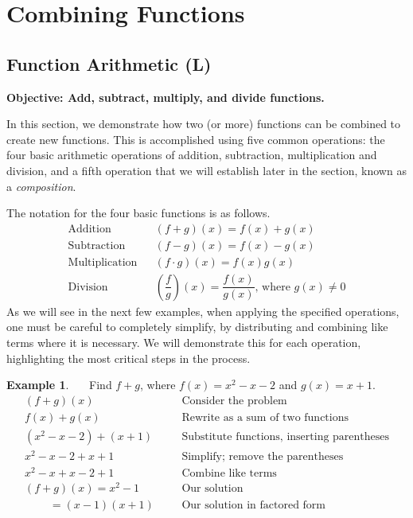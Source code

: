\documentclass[12pt]{book}
\theoremstyle{definition}
\newtheorem{example}{Example}
\newcommand{\tmop}[1]{\ensuremath{\operatorname{#1}}}
\begin{document}
\section{Combining Functions}
\subsection{Function Arithmetic (L)}
{\bf Objective: Add, subtract, multiply, and divide functions.}\par
In this section, we demonstrate how two (or more) functions can be combined to create new functions. This is accomplished using five common
operations:  the four basic arithmetic operations of addition, subtraction, multiplication and division, and a fifth operation that we will establish later in the section, known as a {\it composition}.\par
The notation for the four basic functions is as follows. 
\begin{eqnarray*}
  \tmop{Addition} &  & (f + g) (x) = f (x) + g (x)\\   %
  \tmop{Subtraction} &  & (f - g) (x) = f (x) - g (x)\\  %
  \tmop{Multiplication} &  & (f \cdot g) (x) = f (x)g (x) \\ %
  \tmop{Division} &  & \left( \dfrac{f}{g}\right) (x) = \dfrac{f(x)}{g(x)} \text{,~where $g(x) \neq 0$}  %
\end{eqnarray*}
As we will see in the next few examples, when applying the specified operations, one must be careful to completely simplify, by distributing and combining like terms where it is necessary.  We will demonstrate this for each operation, highlighting the most critical steps in the process.
\begin{example}~~~Find $f+g$, where $f (x) = x^2 - x - 2$ and $g(x) = x + 1$.
  \begin{eqnarray*}
    (f + g)(x)~~~~~~~~~~ &  & \text{Consider the problem} \\
		f(x) + g(x)~~~~~~~~~ &  & \text{Rewrite~as~a~sum~of~two~functions}\\
		(x^2 - x - 2) + (x + 1) &  & \text{Substitute~functions,~inserting~parentheses}\\
		x^2 - x - 2 + x + 1~~ &  & \text{Simplify;~remove~the~parentheses}\\
		x^2 - x + x -2 + 1~~ &  & \text{Combine like terms}\\
    (f + g)(x)=x^2 - 1~~~~~~~~~~ &  & \text{Our solution}\\
    ~~~~~~~~~~=(x-1)(x+1) &  & \text{Our solution in factored form}
  \end{eqnarray*}
\end{example}
\end{document}
